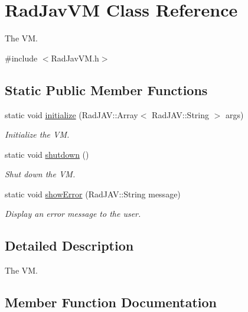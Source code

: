 \hypertarget{class_rad_jav_v_m}{}\section{Rad\+Jav\+VM Class Reference}
\label{class_rad_jav_v_m}


The VM.  




{\ttfamily \#include $<$Rad\+Jav\+V\+M.\+h$>$}

\subsection*{Static Public Member Functions}
\begin{DoxyCompactItemize}
\item 
static void \mbox{\hyperlink{class_rad_jav_v_m_a78f6ae349e1de4fe5f4826edd82e1fb0}{initialize}} (Rad\+J\+A\+V\+::\+Array$<$ Rad\+J\+A\+V\+::\+String $>$ args)
\begin{DoxyCompactList}\small\item\em Initialize the VM. \end{DoxyCompactList}\item 
static void \mbox{\hyperlink{class_rad_jav_v_m_afedb3afab462070c310a53503fa6632b}{shutdown}} ()
\begin{DoxyCompactList}\small\item\em Shut down the VM. \end{DoxyCompactList}\item 
static void \mbox{\hyperlink{class_rad_jav_v_m_aac738fd3fc4ad453782b31fab1f0600f}{show\+Error}} (Rad\+J\+A\+V\+::\+String message)
\begin{DoxyCompactList}\small\item\em Display an error message to the user. \end{DoxyCompactList}\end{DoxyCompactItemize}


\subsection{Detailed Description}
The VM. 

\subsection{Member Function Documentation}
\mbox{\label{class_rad_jav_v_m_a78f6ae349e1de4fe5f4826edd82e1fb0}} 
